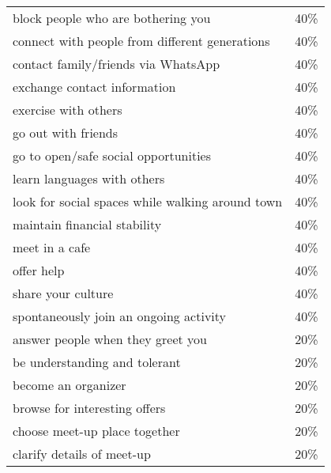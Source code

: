 \begin{longtable}{p{}r}
block people who are bothering you                          & 40\%                        \\
connect with people from different generations              & 40\%                        \\
contact family/friends via WhatsApp                         & 40\%                        \\
exchange contact information                                & 40\%                        \\
exercise with others                                        & 40\%                        \\
go out with friends                                         & 40\%                        \\
go to open/safe social opportunities                        & 40\%                        \\
learn languages with others                                 & 40\%                        \\
look for social spaces while walking around town            & 40\%                        \\
maintain financial stability                                & 40\%                        \\
meet in a cafe                                              & 40\%                        \\
offer help                                                  & 40\%                        \\
share your culture                                          & 40\%                        \\
spontaneously join an ongoing activity                      & 40\%                        \\
answer people when they greet you                           & 20\%                        \\
be understanding and tolerant                               & 20\%                        \\
become an organizer                                         & 20\%                        \\
browse for interesting offers                               & 20\%                        \\
choose meet-up place together                               & 20\%                        \\
clarify details of meet-up                                  & 20\%                        \\

\end{longtable}
